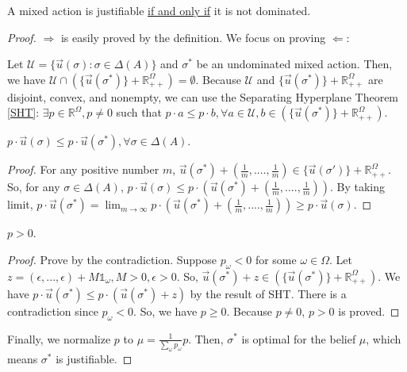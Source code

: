 \documentclass[11pt]{elegantbook_2}
\begin{document}
\begin{theorem}[Domination Theorem: Justifiable $=$ Not Dominated]
    A mixed action is justifiable \underline{if and only if} it is not dominated.
\end{theorem}
\begin{proof}
    $\Rightarrow$ is easily proved by the definition. We focus on proving $\Leftarrow$:
    
    Let $\mathcal{U}=\{\vec{u}(\sigma):\sigma\in\Delta(A)\}$ and $\sigma^*$ be an undominated mixed action. Then, we have $\mathcal{U}\cap(\{\vec{u}(\sigma^*)\}+\mathbb{R}_{++}^\Omega)=\emptyset$. Because $\mathcal{U}$ and $\{\vec{u}(\sigma^*)\}+\mathbb{R}_{++}^\Omega$ are disjoint, convex, and nonempty, we can use the Separating Hyperplane Theorem \ref{SHT}: $\exists p\in \mathbb{R}^\Omega,p\neq 0$ such that $p\cdot a\leq p\cdot b, \forall a\in\mathcal{U}, b\in (\{\vec{u}(\sigma^*)\}+\mathbb{R}_{++}^\Omega)$.

    \begin{claim}
        $p\cdot \vec{u}(\sigma)\leq p\cdot \vec{u}(\sigma^*), \forall \sigma\in\Delta(A)$.
    \end{claim}
    \begin{proof}
        For any positive number $m$, $\vec{u}(\sigma^*)+(\frac{1}{m},....,\frac{1}{m})\in \{\vec{u}(\sigma')\}+\mathbb{R}_{++}^\Omega$. So, for any $\sigma\in\Delta(A)$, $p\cdot \vec{u}(\sigma)\leq p\cdot\left(\vec{u}(\sigma^*)+(\frac{1}{m},....,\frac{1}{m})\right)$. By taking limit, $p\cdot \vec{u}(\sigma^*)=\lim_{m \rightarrow \infty}p\cdot\left(\vec{u}(\sigma^*)+(\frac{1}{m},....,\frac{1}{m})\right)\geq p\cdot \vec{u}(\sigma)$.
    \end{proof}
    \begin{claim}
        $p>0$.
    \end{claim}
    \begin{proof}
        Prove by the contradiction. Suppose $p_\omega<0$ for some $\omega\in\Omega$. Let $z=(\epsilon,...,\epsilon)+M\mathbb{1}_\omega, M>0,\epsilon>0$. So, $\vec{u}(\sigma^*)+z\in (\{\vec{u}(\sigma^*)\}+\mathbb{R}_{++}^\Omega)$. We have $p\cdot\vec{u}(\sigma^*)\leq p\cdot (\vec{u}(\sigma^*)+z)$ by the result of SHT. There is a contradiction since $p_\omega<0$. So, we have $p\geq 0$. Because $p\neq 0$, $p>0$ is proved.
    \end{proof}
    Finally, we normalize $p$ to $\mu=\frac{1}{\sum_{\omega}p_\omega}p$. Then, $\sigma^*$ is optimal for the belief $\mu$, which means $\sigma^*$ is justifiable.
\end{proof}
\end{document}
